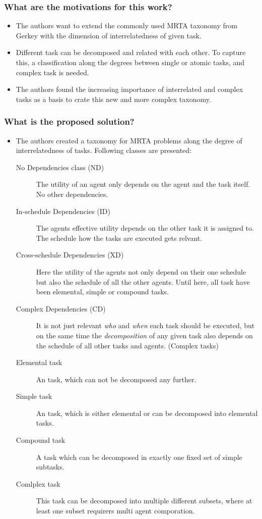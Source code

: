     
    \subsubsection*{What are the motivations for this work?}
    \begin{itemize}
        \item The authors want to extend the commonly used MRTA taxonomy from Gerkey \cite{Gerkey2004} with the dimension of interrelatedness of given task. 
        \item Different task can be decomposed and related with each other. To capture this, a classification along the degrees between single or atomic tasks, and complex task is needed.
        \item The authors found the increasing importance of interrelated and complex tasks as a basis to crate this new and more complex taxonomy.
    \end{itemize}
    \subsubsection*{What is the proposed solution?}
    \begin{itemize}
      \item The authors created a taxonomy for MRTA problems along the degree of interrelatedness of tasks. Following classes are presented: \ 
      \begin{description}
          \item[No Dependencies class (ND)] The utility of an agent only depends on the agent and the task itself. No other dependencies. 
          \item[In-schedule Dependencies (ID)] The agents effective utility depends on the other task it is assigned to. The schedule how the tasks are executed gets relvant.
          \item[Cross-schedule Dependencies (XD)] Here the utility of the agents not only depend on their one schedule but also the schedule of all the other agents. Until here, all task have been elemental, simple or compound tasks.
          \item[Complex Dependencies (CD)] It is not just relevant \emph{who} and \emph{when} each task should be executed, but on the same time the \emph{decomposition} of any given task also depends on the schedule of all other tasks and agents. (Complex tasks)
          \item[Elemental task]  An task, which can not be decomposed any further.
          \item[Simple task]  An task, which is either elemental or can be decomposed into elemental tasks.
          \item[Compound task] A task which can be decomposed in exactly one fixed set of simple subtasks.
          \item[Comlplex task] This task can be decomposed into multiple different subsets, where at least one subset requirers multi agent comporation.
      \end{description}
    \end{itemize}
